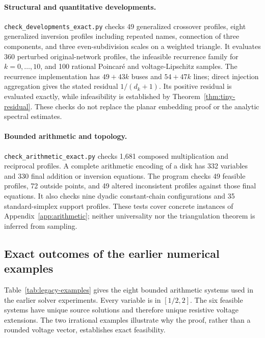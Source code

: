 \paragraph{Structural and quantitative developments.}
\texttt{check\_developments\_exact.py} checks 49 generalized crossover
profiles, eight generalized inversion profiles including repeated names,
connection of three components, and three even-subdivision scales on a
weighted triangle. It evaluates 360 perturbed original-network profiles,
the infeasible recurrence family for $k=0,\ldots,10$, and 100 rational
Poincar\'e and voltage-Lipschitz samples. The recurrence implementation has
$49+43k$ buses and $54+47k$ lines; direct injection aggregation gives the
stated residual $1/(d_k+1)$. Its positive residual is evaluated exactly,
while infeasibility is established by Theorem~\ref{thm:tiny-residual}.
These checks do not replace the planar embedding proof or the analytic
spectral estimates.

\paragraph{Bounded arithmetic and topology.}
\texttt{check\_arithmetic\_exact.py} checks 1,681 composed multiplication
and reciprocal profiles. A complete arithmetic encoding of a disk has 332
variables and 330 final addition or inversion equations. The program checks
49 feasible profiles, 72 outside points, and 49 altered inconsistent profiles
against those final equations. It also checks nine dyadic constant-chain
configurations and 35 standard-simplex support profiles. These tests cover
concrete instances of Appendix~\ref{app:arithmetic}; neither universality nor
the triangulation theorem is inferred from sampling.

\subsection{Exact outcomes of the earlier numerical examples}

Table~\ref{tab:legacy-examples} gives the eight bounded arithmetic systems
used in the earlier solver experiments. Every variable is in $[1/2,2]$.
The six feasible systems have unique source solutions and therefore unique
resistive voltage extensions. The two irrational examples illustrate why
the proof, rather than a rounded voltage vector, establishes exact feasibility.

